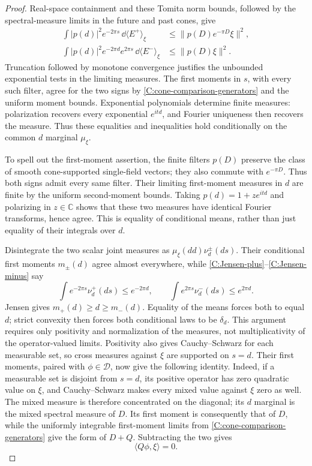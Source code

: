 \begin{proof}
Real-space containment and these Tomita norm bounds, followed by the
spectral-measure limits in the future and past cones, give
\begin{align}
 \int |p(d)|^2e^{-2\pi s}\,\dd\langle E^+\rangle_\xi
 &\le\|p(D)e^{-\pi D}\xi\|^2,\label{C:Jensen-plus}\\
 \int |p(d)|^2e^{-2\pi d}e^{2\pi s}
                  \,\dd\langle E^-\rangle_\xi
 &\le\|p(D)\xi\|^2.\label{C:Jensen-minus}
\end{align}
Truncation followed by monotone convergence justifies
the unbounded exponential tests in the limiting measures.
The first moments in $s$, with every such filter, agree
for the two signs by
\eqref{C:cone-comparison-generators} and the uniform
moment bounds. Exponential polynomials determine finite
measures: polarization recovers every exponential
$e^{itd}$, and Fourier uniqueness then recovers the
measure. Thus these equalities and inequalities hold
conditionally on the common $d$ marginal $\mu_\xi$.

To spell out the first-moment assertion, the finite filters $p(D)$
preserve the class of smooth cone-supported single-field vectors;
they also commute with $e^{-\pi D}$.  Thus both signs admit every
same filter.  Their limiting first-moment measures in $d$ are finite
by the uniform second-moment bounds.  Taking
$p(d)=1+z e^{itd}$ and polarizing in $z\in\mathbb C$ shows that
these two measures have identical Fourier transforms, hence agree.
This is equality of conditional means, rather than just equality
of their integrals over $d$.

Disintegrate the two scalar joint measures as
$\mu_\xi(dd)\nu_d^\pm(ds)$. Their conditional first
moments $m_\pm(d)$ agree almost everywhere, while
\eqref{C:Jensen-plus}--\eqref{C:Jensen-minus} say
\[
 \int e^{-2\pi s}\nu_d^+(ds)\le e^{-2\pi d},
 \qquad
 \int e^{2\pi s}\nu_d^-(ds)\le e^{2\pi d}.
\]
Jensen gives $m_+(d)\ge d\ge m_-(d)$.
Equality of the means forces both to equal $d$; strict
convexity then forces both conditional laws to be
$\delta_d$. This argument requires only positivity and
normalization of the measures, not multiplicativity of
the operator-valued limits. Positivity also gives
Cauchy--Schwarz for each measurable set, so cross
measures against $\xi$ are supported on $s=d$.
Their first moments, paired with $\phi\in\mathscr D$,
now give
the following identity.  Indeed, if a measurable set is disjoint
from $s=d$, its positive operator has zero quadratic value on $\xi$,
and Cauchy--Schwarz makes every mixed value against $\xi$ zero as
well.  The mixed measure is therefore concentrated on the diagonal;
its $d$ marginal is the mixed spectral measure of $D$.  Its first
moment is consequently that of $D$, while the uniformly integrable
first-moment limits from \eqref{C:cone-comparison-generators}
give the form of $D+Q$.  Subtracting the two gives
\begin{equation}\label{C:Q-single-orthogonality}
 \langle Q\phi,\xi\rangle=0.
\end{equation}


\end{proof}
